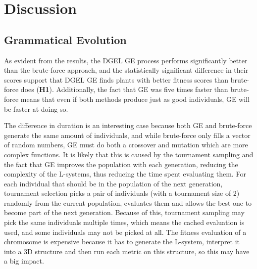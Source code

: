 \chapter{Discussion}
\section{Grammatical Evolution}
\label{sec:discuss-ge}
As evident from the results, the \gls{DGEL} \gls{GE} process performs significantly better than the brute-force approach, and the statistically significant difference in their scores support that \gls{DGEL} \gls{GE} finds plants with better fitness scores than brute-force does (\textbf{H1}).
Additionally, the fact that \gls{GE} was five times faster than brute-force means that even if both methods produce just as good individuals, \gls{GE} will be faster at doing so.

The difference in duration is an interesting case because both \gls{GE} and brute-force generate the same amount of individuals, and while brute-force only fills a vector of random numbers, \gls{GE} must do both a crossover and mutation which are more complex functions.
It is likely that this is caused by the tournament sampling and the fact that \gls{GE} improves the population with each generation, reducing the complexity of the L-systems, thus reducing the time spent evaluating them.
For each individual that should be in the population of the next generation, tournament selection picks a pair of individuals (with a tournament size of 2) randomly from the current population, evaluates them and allows the best one to become part of the next generation.
Because of this, tournament sampling may pick the same individuals multiple times, which means the cached evaluation is used, and some individuals may not be picked at all.
The fitness evaluation of a chromosome is expensive because it has to generate the L-system, interpret it into a 3D structure and then run each metric on this structure, so this may have a big impact.

